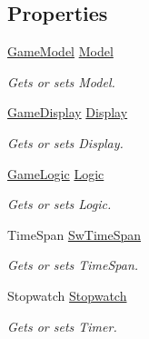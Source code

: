 \subsection*{Properties}
\begin{DoxyCompactItemize}
\item 
\mbox{\hyperlink{class_game_1_1_game_model}{Game\+Model}} \mbox{\hyperlink{class_game_1_1_game_control_a683d4e349dda0c72daecad645ea62542}{Model}}
\begin{DoxyCompactList}\small\item\em Gets or sets Model. \end{DoxyCompactList}\item 
\mbox{\hyperlink{class_game_1_1_game_display}{Game\+Display}} \mbox{\hyperlink{class_game_1_1_game_control_aee5d0e7fcb3ab64a72b5e041b9603293}{Display}}
\begin{DoxyCompactList}\small\item\em Gets or sets Display. \end{DoxyCompactList}\item 
\mbox{\hyperlink{class_game_1_1_game_logic}{Game\+Logic}} \mbox{\hyperlink{class_game_1_1_game_control_a86b2e15b7f099f35f858739f09392ac2}{Logic}}
\begin{DoxyCompactList}\small\item\em Gets or sets Logic. \end{DoxyCompactList}\item 
Time\+Span \mbox{\hyperlink{class_game_1_1_game_control_ac0c79f7cae61e583a25c7d4436905b3f}{Sw\+Time\+Span}}
\begin{DoxyCompactList}\small\item\em Gets or sets Time\+Span. \end{DoxyCompactList}\item 
Stopwatch \mbox{\hyperlink{class_game_1_1_game_control_a15720f8462319c368cb51320535f5512}{Stopwatch}}
\begin{DoxyCompactList}\small\item\em Gets or sets Timer. \end{DoxyCompactList}\end{DoxyCompactItemize}


